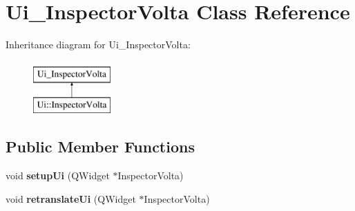 \hypertarget{class_ui___inspector_volta}{}\section{Ui\+\_\+\+Inspector\+Volta Class Reference}
\label{class_ui___inspector_volta}
Inheritance diagram for Ui\+\_\+\+Inspector\+Volta\+:\begin{figure}[H]
\begin{center}
\leavevmode
\includegraphics[height=2.000000cm]{class_ui___inspector_volta}
\end{center}
\end{figure}
\subsection*{Public Member Functions}
\begin{DoxyCompactItemize}
\item 
\mbox{\label{class_ui___inspector_volta_ad0d6eabe99d2f9c15e5567f318a5c9e6}} 
void {\bfseries setup\+Ui} (Q\+Widget $\ast$Inspector\+Volta)
\item 
\mbox{\label{class_ui___inspector_volta_a2c6716d805e8525ca2b3e72e3eff1bdd}} 
void {\bfseries retranslate\+Ui} (Q\+Widget $\ast$Inspector\+Volta)
\end{DoxyCompactItemize}
